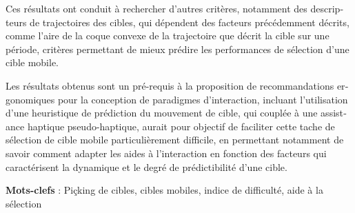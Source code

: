 \begin{otherlanguage}{english}
Ces résultats ont conduit à rechercher d’autres critères, notamment des descripteurs de trajectoires des cibles, qui dépendent des facteurs précédemment décrits, comme l’aire de la coque convexe de la trajectoire que décrit la cible sur une période, critères permettant de mieux prédire les performances de sélection d’une cible mobile.

Les résultats obtenus sont un pré-requis à la proposition de recommandations ergonomiques pour la conception de paradigmes d’interaction, incluant l’utilisation d’une heuristique de prédiction du mouvement de cible, qui couplée à une assistance haptique pseudo-haptique, aurait pour objectif de faciliter cette tache de sélection de cible mobile particulièrement difficile, en permettant notamment de savoir comment adapter les aides à l’interaction en fonction des facteurs qui caractérisent la dynamique et le degré de prédictibilité d’une cible. 


\textbf{Mots-clefs} : Piçking de cibles, cibles mobiles, indice de difficulté, aide à la sélection

\end{otherlanguage} 
